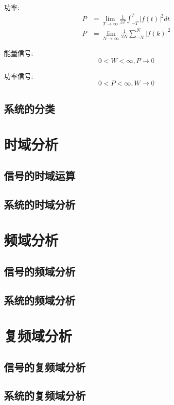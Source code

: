 \documentclass[12pt, a4paper, oneside]{ctexart}
\begin{document}
功率:
\begin{align*}
    P &= \lim_{T \to \infty}\frac{1}{2T}\int_{-T}^{T}|f(t)|^2 dt\\
    P &= \lim_{N \to \infty}\frac{1}{2N}\sum_{-N}^{N}|f(k)|^2
\end{align*}

能量信号:
\[
    0<W<\infty,P\to 0
\]

功率信号:
\[
    0<P<\infty,W\to 0
\]

\subsection{系统的分类}

\section{时域分析}
\subsection{信号的时域运算}
\subsection{系统的时域分析}

\section{频域分析}
\subsection{信号的频域分析}
\subsection{系统的频域分析}

\section{复频域分析}
\subsection{信号的复频域分析}
\subsection{系统的复频域分析}
\end{document}
